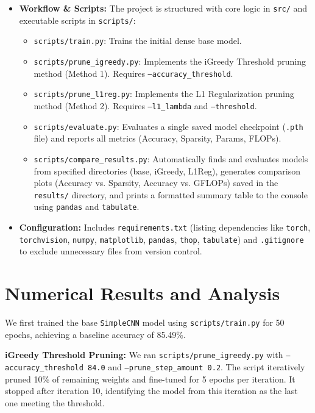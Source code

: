 \documentclass[conference]{IEEEtran} %
\begin{document}
\begin{itemize}
\begin{itemize}
        \end{itemize}
    \item \textbf{Workflow \& Scripts:} The project is structured with core logic in \texttt{src/} and executable scripts in \texttt{scripts/}:
        \begin{itemize}
            \item \texttt{scripts/train.py}: Trains the initial dense base model.
            \item \texttt{scripts/prune\_igreedy.py}: Implements the iGreedy Threshold pruning method (Method 1). Requires \texttt{--accuracy\_threshold}.
            \item \texttt{scripts/prune\_l1reg.py}: Implements the L1 Regularization pruning method (Method 2). Requires \texttt{--l1\_lambda} and \texttt{--threshold}.
            \item \texttt{scripts/evaluate.py}: Evaluates a single saved model checkpoint (\texttt{.pth} file) and reports all metrics (Accuracy, Sparsity, Params, FLOPs).
            \item \texttt{scripts/compare\_results.py}: Automatically finds and evaluates models from specified directories (base, iGreedy, L1Reg), generates comparison plots (Accuracy vs. Sparsity, Accuracy vs. GFLOPs) saved in the \texttt{results/} directory, and prints a formatted summary table to the console using \texttt{pandas} and \texttt{tabulate}.
        \end{itemize}
    \item \textbf{Configuration:} Includes \texttt{requirements.txt} (listing dependencies like \texttt{torch}, \texttt{torchvision}, \texttt{numpy}, \texttt{matplotlib}, \texttt{pandas}, \texttt{thop}, \texttt{tabulate}) and \texttt{.gitignore} to exclude unnecessary files from version control.
\end{itemize}

\section{Numerical Results and Analysis}
We first trained the base \texttt{SimpleCNN} model using \texttt{scripts/train.py} for 50 epochs, achieving a baseline accuracy of 85.49\%.

\textbf{iGreedy Threshold Pruning:} We ran \texttt{scripts/prune\_igreedy.py} with \texttt{--accuracy\_threshold 84.0} and \texttt{--prune\_step\_amount 0.2}. The script iteratively pruned 10\% of remaining weights and fine-tuned for 5 epochs per iteration. It stopped after iteration 10, identifying the model from this iteration as the last one meeting the threshold.
\end{document}
